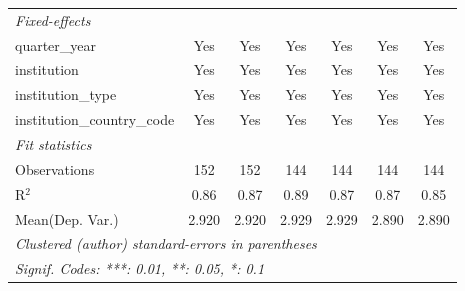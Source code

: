 \begin{tabular}{lcccccc}
   \midrule
   \emph{Fixed-effects}\\
   quarter\_year                      & Yes           & Yes            & Yes            & Yes            & Yes           & Yes\\  
   institution                        & Yes           & Yes            & Yes            & Yes            & Yes           & Yes\\  
   institution\_type                  & Yes           & Yes            & Yes            & Yes            & Yes           & Yes\\  
   institution\_country\_code         & Yes           & Yes            & Yes            & Yes            & Yes           & Yes\\  
   \midrule
   \emph{Fit statistics}\\
   Observations                       & 152           & 152            & 144            & 144            & 144           & 144\\  
   R$^2$                              & 0.86          & 0.87           & 0.89           & 0.87           & 0.87          & 0.85\\  
Mean(Dep. Var.) & 2.920 & 2.920 & 2.929 & 2.929 & 2.890 & 2.890 \\
   \midrule \midrule
   \multicolumn{7}{l}{\emph{Clustered (author) standard-errors in parentheses}}\\
   \multicolumn{7}{l}{\emph{Signif. Codes: ***: 0.01, **: 0.05, *: 0.1}}\\
\end{tabular}
\par\endgroup
